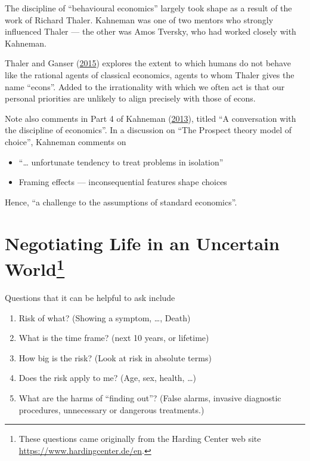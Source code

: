 \documentclass[
  10pt,
  b5paper]{book}
\providecommand{\tightlist}{%
  \setlength{\itemsep}{0pt}\setlength{\parskip}{0pt}}
\begin{document}
The discipline of ``behavioural economics'' largely took shape as a result of the work of Richard Thaler. Kahneman was one of two mentors who strongly influenced Thaler --- the other was Amos Tversky, who had worked closely with Kahneman.

Thaler and Ganser (\protect\hyperlink{ref-thaler2015misbehaving}{2015}) explores the extent to which humans do not behave like the rational agents of classical economics, agents to whom Thaler gives the name ``econs''. Added to the irrationality with which we often act is that our personal priorities are unlikely to align precisely with those of econs.

Note also comments in Part 4 of Kahneman (\protect\hyperlink{ref-kahneman_2013}{2013}), titled ``A conversation with the discipline of economics''. In a discussion on ``The Prospect theory model of choice'', Kahneman comments on

\begin{itemize}
\tightlist
\item
  ``\ldots{} unfortunate tendency to treat problems in isolation''
\item
  Framing effects --- inconsequential features shape choices
\end{itemize}

Hence, ``a challenge to the assumptions of standard economics''.

\hypertarget{negotiating-life-in-an-uncertain-world01-judgment-5}{%
\section[Negotiating Life in an Uncertain World]{\texorpdfstring{Negotiating Life in an Uncertain World\footnote{These questions came originally from the Harding Center web site \url{https://www.hardingcenter.de/en}.}}{Negotiating Life in an Uncertain World}}\label{negotiating-life-in-an-uncertain-world01-judgment-5}}

Questions that it can be helpful to ask include

\begin{enumerate}
\def\labelenumi{\arabic{enumi}.}
\tightlist
\item
  Risk of what? (Showing a symptom, \ldots, Death)
\item
  What is the time frame? (next 10 years, or lifetime)
\item
  How big is the risk? (Look at risk in absolute terms)
\item
  Does the risk apply to me? (Age, sex, health, \ldots)
\item
  What are the harms of ``finding out''? (False alarms, invasive diagnostic procedures, unnecessary or dangerous treatments.)
\end{enumerate}
\end{document}
